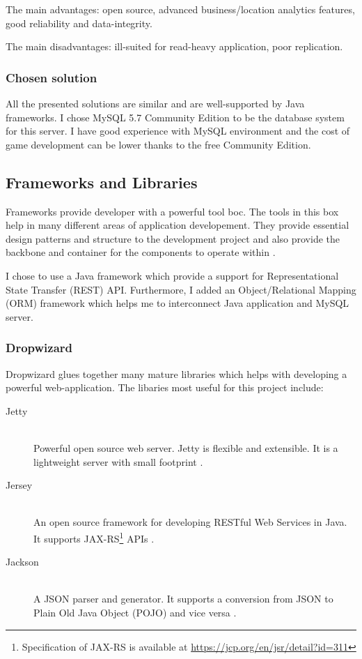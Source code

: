 		The main advantages: open source, advanced business/location analytics features, good reliability and data-integrity.
		
		The main disadvantages: ill-suited for read-heavy application, poor replication.
				
		\subsubsection{Chosen solution}
		All the presented solutions are similar and are well-supported by Java frameworks. I chose MySQL 5.7 Community Edition to be the database system for this server. I have good experience with MySQL environment and the cost of game development can be lower thanks to the free Community Edition. 
		
	\subsection{Frameworks and Libraries}
	Frameworks provide developer with a powerful tool boc. The tools in this box help in many different areas of application developement. They provide essential design patterns and structure to the development project and also provide the backbone and container for the components to operate within \cite{frameworks}.
	
	I chose to use a Java framework which provide a support for Representational State Transfer (REST) API. Furthermore, I added an Object/Relational Mapping (ORM) framework which helps me to interconnect Java application and MySQL server.
	
		\subsubsection{Dropwizard}
		Dropwizard \cite{dropwizard} glues together many mature libraries which helps with developing a powerful web-application. The libaries most useful for this project include:
		\begin{description}
			\item [Jetty] \hfill \\
				Powerful open source web server. Jetty is flexible and extensible. It is a lightweight server with small footprint \cite{jetty}.
			\item [Jersey] \hfill \\
				An open source framework for developing RESTful Web Services in Java. It supports JAX-RS\footnote{Specification of JAX-RS is available at \url{https://jcp.org/en/jsr/detail?id=311}} APIs \cite{jersey}.
			\item [Jackson] \hfill \\
				A JSON parser and generator. It supports a conversion from JSON to Plain Old Java Object (POJO) and vice versa \cite{jackson}.			
		\end{description}
